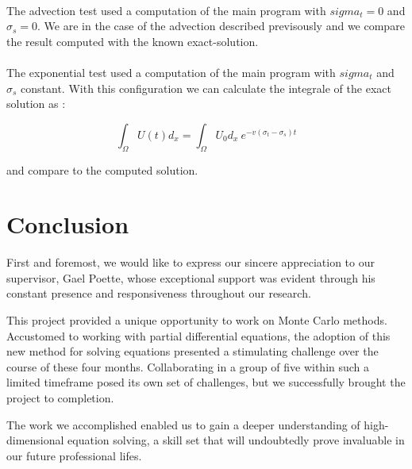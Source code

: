 \documentclass[a4paper, 11pt]{article}
\begin{document}
\paragraph{}
The advection test used a computation of the main program with $sigma_t=0$ and $\sigma_s=0$. We are in the case of the advection described previsously and we compare the result computed with the known exact-solution.


\paragraph{}
The exponential test used a computation of the main program with $sigma_t$ and $\sigma_s$ constant. With this configuration we can calculate the integrale of the exact solution as :

$$\int_{\Omega} U(t)d_{x}=\int_{\Omega} U_0 d_{x} ~ e^{-v(\sigma_t-\sigma_s)t} $$

and compare to the computed solution.


\section{Conclusion}

First and foremost, we would like to express our sincere appreciation to our supervisor, Gael Poette, whose exceptional support was evident through his constant presence and responsiveness throughout our research.

This project provided a unique opportunity to work on Monte Carlo methods. Accustomed to working with partial differential equations, the adoption of this new method for solving equations presented a stimulating challenge over the course of these four months. Collaborating in a group of five within such a limited timeframe posed its own set of challenges, but we successfully brought the project to completion.

The work we accomplished enabled us to gain a deeper understanding of high-dimensional equation solving, a skill set that will undoubtedly prove invaluable in our future professional lifes.
	
	
	
\newpage

\nocite{*}


	
\end{document}
